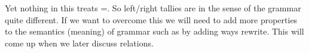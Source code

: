 Yet nothing in this treats =.  So left/right 
tallies are in the sense of the grammar quite different.  If we 
want to overcome this we will need to add more properties to the 
semantics (meaning) of grammar such as by adding ways rewrite.
This will come up when we later discuss relations.
